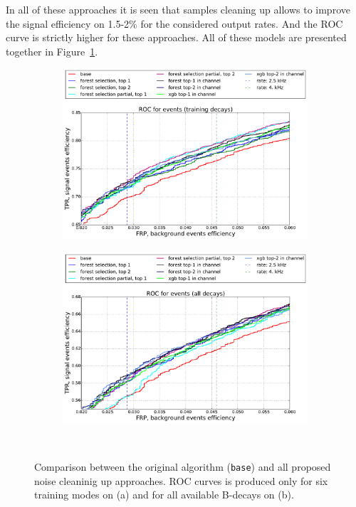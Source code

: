 \documentclass{llncs}
\begin{document}
In all of these approaches it is seen that samples cleaning up allows to improve the signal efficiency on 1.5-2\% for the considered output rates. And the ROC curve is strictly higher for these approaches. All of these models are presented together in Figure~\ref{fig:all_rocs}.

\begin{figure}
	\begin{center}
    	\begin{subfigure}[b]{0.45\textwidth}
    		\includegraphics[width=\textwidth]{../../img/roc_training_all} \caption{}
    	\end{subfigure} %
    	\begin{subfigure}[b]{0.45\textwidth}
    		\includegraphics[width=\textwidth]{../../img/roc_all} \caption{} %
    	\end{subfigure}
    \end{center}
  \caption{Comparison between the original algorithm (\texttt{base}) and all proposed noise cleaninig up approaches. ROC curves is produced only for six training modes on (a) and for all available B-decays on (b).}~\label{fig:all_rocs}
\end{figure}
\end{document}
